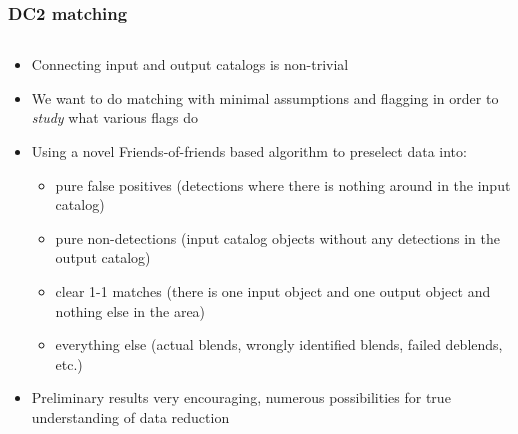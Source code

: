 \documentclass{beamer}
\begin{document}
\begin{frame}
  \frametitle{DC2 matching}

  \begin{columns}
    \begin{column}{7.5cm}
      \begin{itemize}
      \item Connecting input and output catalogs is non-trivial
      
      \item We want to do matching with minimal assumptions and
        flagging in order to \emph{study} what various flags do

      \item Using a novel Friends-of-friends based algorithm to
        preselect data into:
        \begin{itemize}
          \scriptsize
        \item  pure false positives (detections where
        there is nothing around in the input catalog)

      \item pure non-detections (input catalog objects without any
         detections in the output catalog)

      \item clear 1-1 matches (there is one input object and one
        output object and nothing else in the area)

      \item everything else (actual blends, wrongly identified blends,
        failed deblends, etc.)


        \end{itemize}
      \item Preliminary results very encouraging, numerous
        possibilities for true understanding of data reduction


\end{itemize}
\end{column}
\end{columns}
\end{frame}
\end{document}
